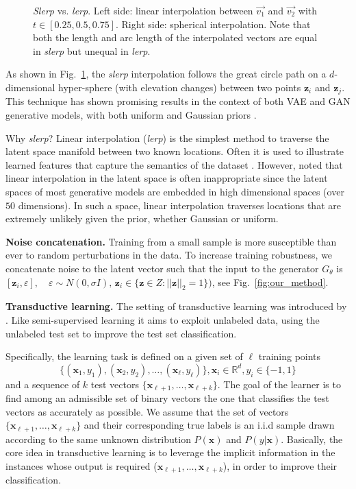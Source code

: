 \documentclass[a4paper,conference]{IEEEtran}
\newcommand{\bz}{{\mathbf z}}
\newcommand{\bx}{{\mathbf x}}
\begin{document}
\begin{figure}[htbp]
\begin{tikzpicture}[scale=0.57]
	\end{tikzpicture}
	\caption[Slerp vs Lerp.]{\emph{Slerp} vs. \emph{lerp}. Left side: linear interpolation between $\vec{v_1}$ and $\vec{v_2}$ with $t\in [0.25,0.5,0.75]$. Right side: spherical interpolation. Note that both the length and arc length of the interpolated vectors are equal in \emph{slerp} but unequal in \emph{lerp}.}
	\label{fig:slerp}
\end{figure}
		
As shown in Fig.~\ref{fig:slerp}, the \emph{slerp} interpolation follows the great circle path on a $d$-dimensional hyper-sphere (with elevation changes) between two points $\bz_i$ and $\bz_j$. This technique has shown promising results in the context of both VAE and GAN generative models, with both uniform and Gaussian priors \cite{SamplingGenerativeNetworks}.

Why \emph{slerp}? Linear interpolation (\emph{lerp}) is the simplest method to traverse the latent space manifold between two known locations. Often it is used to illustrate learned features that capture the semantics of the dataset \cite{NIPS2012_4824}. However, \cite{arvanitidis2017latent} noted that linear interpolation in the latent space is often inappropriate since the latent spaces of most generative models are embedded in high dimensional spaces (over $50$ dimensions). In such a space, linear interpolation traverses locations that are extremely unlikely given the prior, whether Gaussian or uniform.

\textbf{Noise concatenation.} Training from a small sample is more susceptible than ever to random perturbations in the data. To increase training robustness, we concatenate noise to the latent vector such that the input to the generator $G_\theta$ is $[\bz_i, \varepsilon],\quad \varepsilon \sim N(0,\sigma I), \,\bz_i \in \{\bz \in Z : ||\bz||_2 =1\})$, see Fig.~\ref{fig:our_method}.


		
\textbf{Transductive learning.}
The setting of transductive learning was introduced by \cite{vapnik1998statistical}. Like semi-supervised learning it aims to exploit unlabeled data, using the unlabeled test set to improve the test set classification.

Specifically, the learning task is defined on a given set of $\ell$ training points $$\{(\bx_1,y_1),(\bx_2,y_2),\ldots ,(\bx_\ell,y_\ell)\},\bx_i \in \mathbb{R}^d,y_i\in \{-1,1\} $$ and a sequence of $k$ test vectors $\{\bx_{\ell+1},\ldots,\bx_{\ell+k}\}$. The goal of the learner is to find among an admissible set of binary vectors the one that classifies the test vectors as accurately as possible. We assume that the set of vectors $\{\bx_{\ell+1},\ldots,\bx_{\ell+k}\}$ and their corresponding true labels is an i.i.d sample drawn according to the same unknown distribution $P(\bx)$ and $P(y|\bx)$. Basically, the core idea in transductive learning is to leverage the implicit information in the instances whose output is required ($\bx_{\ell+1},\ldots,\bx_{\ell+k}$), in order to improve their classification.
		
\end{document}

